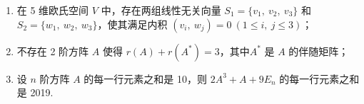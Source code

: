 \begin{enumerate}
\begin{enumerate}[label=(\arabic*)]
        \item 在 5 维欧氏空间 $V$ 中，存在两组线性无关向量 $S_1=\{v_1,\ v_2,\ v_3\}$ 和 $S_2=\{w_1,\ w_2,\ w_3\}$，使其满足内积 $(v_i,\ w_j)=0\ (1 \leq i,\ j \leq 3)$；

        \item 不存在 2 阶方阵 $A$ 使得 $r(A)+r(A^*)=3$，其中$A^*$ 是 $A$ 的伴随矩阵；

        \item 设 $n$ 阶方阵 $A$ 的每一行元素之和是 10，则 $2A^3+A+9E_n$ 的每一行元素之和是 2019.
    \end{enumerate}
\end{enumerate}

\clearpage
